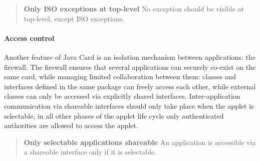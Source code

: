 \begin{quote}
\textbf{Only ISO exceptions at top-level}
No exception should be visible at top-level, except ISO
exceptions.
\end{quote}

\paragraph {Access control} 

Another feature of Java Card is an isolation mechanism between
applications: the firewall. The firewall ensures that several
applications can securely co-exist on the same card, while managing
limited collaboration between them: classes and interfaces defined in
the same package can freely access each other, while external classes
can only be accessed via explicitly shared
interfaces. Inter-application communication via shareable interfaces
should only take place when the applet is selectable, in all other
phases of the applet life cycle only authenticated authorities are
allowed to access the applet. 
\begin{quote}
\textbf{Only selectable applications shareable} An application is accessible
via a shareable interface only if it is selectable.
\end{quote}

